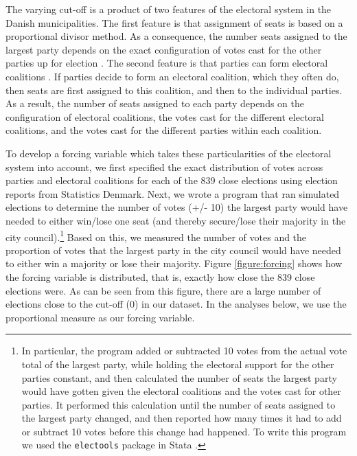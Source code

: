 \documentclass[a4paper,12pt]{article}
\begin{document}
The varying cut-off is a product of two features of the electoral system in the Danish municipalities. The first feature is that assignment of seats is based on a proportional divisor method. As a consequence, the number seats assigned to the largest party depends on the exact configuration of votes cast for the other parties up for election \citep{fiva2016power,folke2014shades,freier2015parties}. The second feature is that parties can form electoral coalitions \citep{cox1997making}. If parties decide to form an electoral coalition, which they often do, then seats are first assigned to this coalition, and then to the individual parties. As a result, the number of seats assigned to each party depends on the configuration of electoral coalitions, the votes cast for the different electoral coalitions, and the votes cast for the different parties within each coalition.

To develop a forcing variable which takes these particularities of the electoral system into account, we first specified the exact distribution of votes across parties and electoral coalitions for each of the 839 close elections using election reports from Statistics Denmark. Next, we wrote a program that ran simulated elections to determine the number of votes (+/- 10) the largest party would have needed to either win/lose one seat (and thereby secure/lose their majority in the city council).\footnote{In particular, the program added or subtracted 10 votes from the actual vote total of the largest party, while holding the electoral support for the other parties constant, and then calculated the number of seats the largest party would have gotten given the electoral coalitions and the votes cast for other parties. It performed this calculation until the number of seats assigned to the largest party changed, and then reported how many times it had to add or subtract 10 votes before this change had happened. To write this program we used the \texttt{electools} package in Stata \citep{electools}.} Based on this, we measured the number of votes and the proportion of votes that the largest party in the city council would have needed to either win a majority or lose their majority. Figure \ref{figure:forcing} shows how the forcing variable is distributed, that is, exactly how close the 839 close elections were. As can be seen from this figure, there are a large number of elections close to the cut-off (0) in our dataset. In the analyses below, we use the proportional measure as our forcing variable. 
\end{document}
